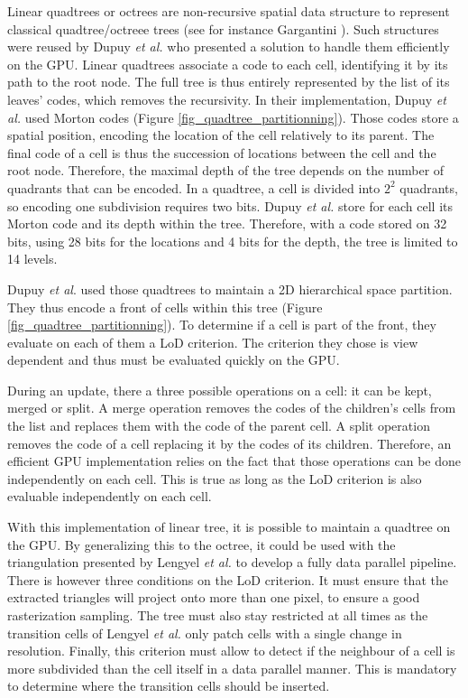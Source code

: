 \documentclass{llncs}
\begin{document}
Linear quadtrees or octrees are non-recursive spatial data structure
to represent classical quadtree/octreee trees (see for instance
Gargantini \cite{gargantini1982effective}).  Such structures were
reused by Dupuy \textit{et al.}  \cite{dupuy2014quadtrees} who
presented a solution to handle them efficiently on the GPU.  Linear
quadtrees associate a code to each cell, identifying it by its path to
the root node.  The full tree is thus entirely represented by the list
of its leaves' codes, which removes the recursivity.  In their
implementation, Dupuy \textit{et al.} used Morton codes (Figure
\ref{fig_quadtree_partitionning}).  Those codes store a spatial
position, encoding the location of the cell relatively to its parent.
The final code of a cell is thus the succession of locations between
the cell and the root node.  Therefore, the maximal depth of the tree
depends on the number of quadrants that can be encoded.  In a
quadtree, a cell is divided into $2^2$ quadrants, so encoding one
subdivision requires two bits.  Dupuy \textit{et al.} store for each
cell its Morton code and its depth within the tree.  Therefore, with a
code stored on 32 bits, using 28 bits for the locations and 4 bits for
the depth, the tree is limited to 14 levels.

Dupuy \textit{et al}. used those quadtrees to maintain a 2D
hierarchical space partition.  They thus encode a front of cells
within this tree (Figure \ref{fig_quadtree_partitionning}).  To
determine if a cell is part of the front, they evaluate on each of
them a LoD criterion.  The criterion they chose is view dependent and
thus must be evaluated quickly on the GPU.

During an update, there a three possible operations on a cell: it can
be kept, merged or split.  A merge operation removes the codes of the
children's cells from the list and replaces them with the code of the
parent cell.  A split operation removes the code of a cell replacing
it by the codes of its children.  Therefore, an efficient GPU
implementation relies on the fact that those operations can be done
independently on each cell.  This is true as long as the LoD criterion
is also evaluable independently on each cell.

With this implementation of linear tree, it is possible to maintain a
quadtree on the GPU.  By generalizing this to the octree, it could be
used with the triangulation presented by Lengyel \textit{et al.} to
develop a fully data parallel pipeline.  There is however three
conditions on the LoD criterion.  It must ensure that the extracted
triangles will project onto more than one pixel, to ensure a good
rasterization sampling.  The tree must also stay restricted at all
times as the transition cells of Lengyel \textit{et al.} only patch
cells with a single change in resolution.  Finally, this criterion
must allow to detect if the neighbour of a cell is more subdivided
than the cell itself in a data parallel manner.  This is mandatory to
determine where the transition cells should be inserted.
\end{document}
